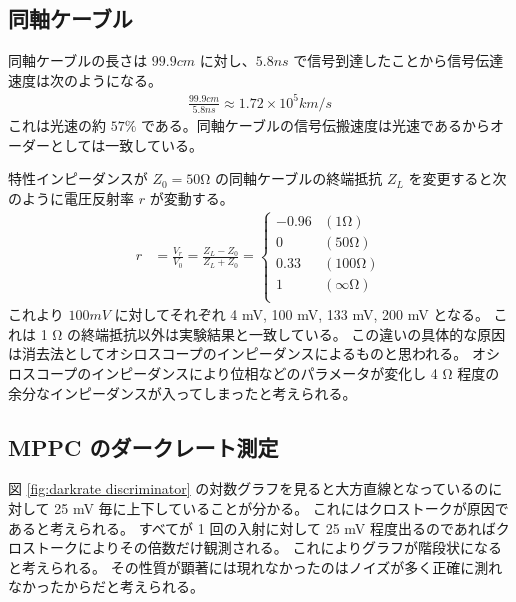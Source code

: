 \documentclass[uplatex,dvipdfmx,a4paper,11pt]{jlreq}
\numberwithin{equation}{section}
\theoremstyle{definition}
\begin{document}
\subsection{同軸ケーブル}
同軸ケーブルの長さは $99.9\si{cm}$ に対し、$5.8\si{ns}$ で信号到達したことから信号伝達速度は次のようになる。
\begin{align}
  \frac{99.9\si{cm}}{5.8\si{ns}} \approx 1.72\times 10^5\si{km/s}
\end{align}
これは光速の約 $57\%$ である。同軸ケーブルの信号伝搬速度は光速であるからオーダーとしては一致している。

特性インピーダンスが $Z_0 = 50\si{\ohm}$ の同軸ケーブルの終端抵抗 $Z_L$ を変更すると次のように電圧反射率 $r$ が変動する。
\begin{align}
  r & = \frac{V_r}{V_0} = \frac{Z_L - Z_0}{Z_L + Z_0} = \begin{cases}
                                                          -0.96 & (1 \si{\ohm})      \\
                                                          0     & (50 \si{\ohm})     \\
                                                          0.33  & (100 \si{\ohm})    \\
                                                          1     & (\infty \si{\ohm}) \\
                                                        \end{cases}
\end{align}
これより $100 \si{mV}$ に対してそれぞれ 4 \si{mV}, 100 \si{mV}, 133 \si{mV}, 200 \si{mV} となる。
これは 1 \si{\ohm} の終端抵抗以外は実験結果と一致している。
この違いの具体的な原因は消去法としてオシロスコープのインピーダンスによるものと思われる。
オシロスコープのインピーダンスにより位相などのパラメータが変化し 4 \si{\ohm} 程度の余分なインピーダンスが入ってしまったと考えられる。


\subsection{MPPC のダークレート測定}
図 \ref{fig:darkrate discriminator} の対数グラフを見ると大方直線となっているのに対して 25 \si{mV} 毎に上下していることが分かる。
これにはクロストークが原因であると考えられる。
すべてが 1 回の入射に対して 25 \si{mV} 程度出るのであればクロストークによりその倍数だけ観測される。
これによりグラフが階段状になると考えられる。
その性質が顕著には現れなかったのはノイズが多く正確に測れなかったからだと考えられる。
\end{document}
